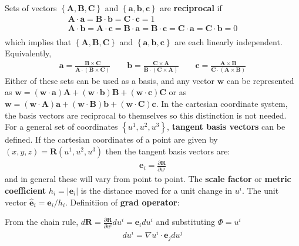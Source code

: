 \documentclass[12pt]{article}
\newcommand{\ve}[1]{\ensuremath{\boldsymbol{#1}}}
\newcommand{\hv}[1]{\hat{\ve{#1}}}
\newcommand{\bvec}{\ve{b}}
\newcommand{\Bvec}{\ve{B}}
\begin{document}
Sets of vectors $\left\{\mathbf{A, B, C}\right\}$ and $\left\{\mathbf{a, b, 
c}\right\}$ are {\bf reciprocal} if
%
\begin{align*}
\mathbf{A\cdot a} = \mathbf{B\cdot b} = \mathbf{C\cdot c} = 1\\
\mathbf{A\cdot b} = \mathbf{A\cdot c} = \mathbf{B\cdot a} = \mathbf{B\cdot c} = 
\mathbf{C\cdot a} = \mathbf{C\cdot b} = 0 \\
\end{align*}
%
which implies that $\left\{\mathbf{A, B, C}\right\}$ and $\left\{\mathbf{a, b, 
c}\right\}$ are each linearly independent.
Equivalently,
%
\begin{align*}
\mathbf{a} = \frac{\mathbf{B\times C}}{\mathbf{A\cdot\left(B\times 
C\right)}}\qquad
\bvec = \frac{\mathbf{C\times A}}{\mathbf{B\cdot\left(C\times 
A\right)}}\qquad
\mathbf{c} = \frac{\mathbf{A\times B}}{\mathbf{C\cdot\left(A\times B\right)}}
\end{align*}
%
Either of these sets can be used as a basis, and any vector $\mathbf{w}$ can be 
represented as
$\mathbf{w} = \left(\mathbf{w\cdot a}\right)\mathbf{A} + \left(\mathbf{w\cdot 
b}\right)\Bvec +
\left(\mathbf{w\cdot c}\right)\mathbf{C}$ or as $\mathbf{w} = 
\left(\mathbf{w\cdot A}\right)\mathbf{a} +
\left(\mathbf{w\cdot B}\right)\bvec + \left(\mathbf{w\cdot 
C}\right)\mathbf{c}$. In the cartesian
coordinate system, the basis vectors are reciprocal to themselves so this 
distinction is not needed.
For a general set of coordinates $\left\{u^1, u^2, u^3\right\}$, {\bf tangent 
basis vectors} can be defined. If
the cartesian coordinates of a point are given by $\left(x, y, z\right) = 
\mathbf{R}\left(u^1, u^2, u^3\right)$
then the tangent basis vectors are:
%
\begin{align*}
\ve{e}_i = \frac{\partial\mathbf{R}}{\partial u^i}
\end{align*}
%
and in general these will vary from point to point. The {\bf scale 
factor} or {\bf metric coefficient}
$h_i =\left|\ve{e}_i\right| $ is the distance moved for a unit change in 
$u^i$. The unit vector
$\hv{e}_i = \ve{e}_i/h_i$. Definitiion of {\bf grad operator}:
%
\begin{center}
\end{center}
%
From the chain rule, $d\mathbf{R} = 
\frac{\partial\mathbf{R}}{\partial u^i}du^i = \ve{e}_idu^i$
and substituting $\Phi = u^i$
%
\begin{align*}
du^i = \nabla u^i\cdot\ve{e}_jdu^j
\end{align*}
\end{document}
